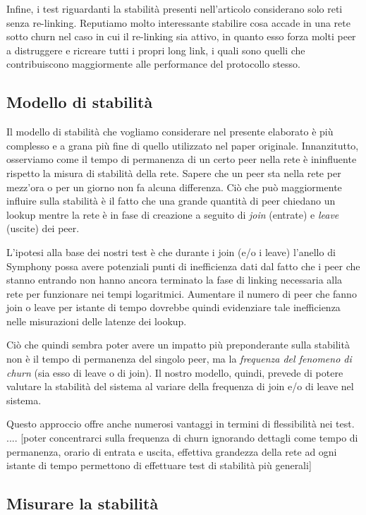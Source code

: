 \documentclass[prodmode,acmtap]{acmlarge}
\begin{document}
Infine, i test riguardanti la stabilità presenti nell'articolo considerano solo reti senza re-linking. Reputiamo molto interessante stabilire cosa accade in una rete sotto churn nel caso in cui il re-linking sia attivo, in quanto esso forza molti peer a distruggere e ricreare tutti i propri long link, i quali sono quelli che contribuiscono maggiormente alle performance del protocollo stesso.


\subsection{Modello di stabilità}

Il modello di stabilità che vogliamo considerare nel presente elaborato è più complesso e a grana più fine di quello utilizzato nel paper originale. Innanzitutto, osserviamo come il tempo di permanenza di un certo peer nella rete è ininfluente rispetto la misura di stabilità della rete. Sapere che un peer sta nella rete per mezz'ora o per un giorno non fa alcuna differenza. Ciò che può maggiormente influire sulla stabilità è il fatto che una grande quantità di peer chiedano un lookup mentre la rete è in fase di creazione a seguito di \emph{join} (entrate) e \emph{leave} (uscite) dei peer.

L'ipotesi alla base dei nostri test è che durante i join (e/o i leave) l'anello di Symphony possa avere potenziali punti di inefficienza dati dal fatto che i peer che stanno entrando non hanno ancora terminato la fase di linking necessaria alla rete per funzionare nei tempi logaritmici. Aumentare il numero di peer che fanno join o leave per istante di tempo dovrebbe quindi evidenziare tale inefficienza nelle misurazioni delle latenze dei lookup.

Ciò che quindi sembra poter avere un impatto più preponderante sulla stabilità non è il tempo di permanenza del singolo peer, ma la \emph{frequenza del fenomeno di churn} (sia esso di leave o di join). Il nostro modello, quindi, prevede di potere valutare la stabilità del sistema al variare della frequenza di join e/o di leave nel sistema.

Questo approccio offre anche numerosi vantaggi in termini di flessibilità nei test. .... [poter concentrarci sulla frequenza di churn ignorando dettagli come tempo di permanenza, orario di entrata e uscita, effettiva grandezza della rete ad ogni istante di tempo permettono di effettuare test di stabilità più generali]


\subsection{Misurare la stabilità}
\end{document}
